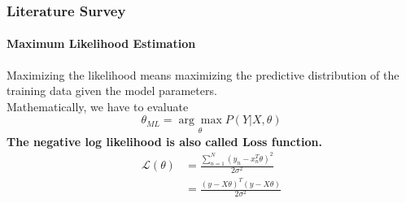 \documentclass[handout,9pt]{beamer}
\numberwithin{theorem}{section}
\begin{document}
\begin{frame}
		\begin{spacing}{1}
		\frametitle{Literature Survey}
		\framesubtitle{Maximum Likelihood Estimation}
		Maximizing the likelihood means maximizing the predictive distribution of the training data given the model parameters.\\
		Mathematically, we have to evaluate\\
		\begin{equation*}
			\theta_{ML} = \underset{\theta}{\arg\max}  P(Y|X,\theta)
		\end{equation*} \pause \vspace{0.2cm}
		\textbf{The negative log likelihood is also called Loss function.}\\
		\begin{align*}
			\mathcal{L}(\theta) &= \frac{\sum_{n=1}^{N}(y_{n}-x_{n}^T\theta)^2}{2\sigma^2}\\ 
			&=\frac{(y-X\theta)^T(y-X\theta)}{2\sigma^2} 
		\end{align*}
	\end{spacing}
\end{frame}
\end{document}
